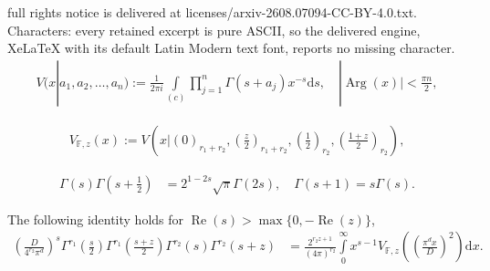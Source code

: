 \documentclass[10pt,a4paper]{amsart}
\newcommand{\Arg}{\operatorname{Arg}}
\renewcommand{\Re}{\operatorname{Re}}
\begin{document}
full rights notice is delivered at licenses/arxiv-2608.07094-CC-BY-4.0.txt. Characters: every retained excerpt is pure ASCII, so the delivered engine, XeLaTeX with its default Latin Modern text font, reports no missing character.
\begin{align}\label{Steen fn}
V(x| a_1, a_2, \ldots, a_n) := \frac{1}{2\pi i}\int\limits_{(c)}\prod_{j=1}^{n}\Gamma(s + a_j)x^{-s}\text{d}s, \quad |\Arg(x)| < \frac{\pi n}{2}, 
\end{align}

\begin{align}\label{Short notation}
V_{\mathbb{F},z}(x) := V\left(x\bigg|\left(0\right)_{r_1 + r_2}, \left(\frac{z}{2}\right)_{r_1 + r_2}, \left(\frac{1}{2}\right)_{r_2}, \left(\frac{1+z}{2}\right)_{r_2}\right),
\end{align}

\begin{align}\label{Legendre's Duplication Formula}
\Gamma(s)\Gamma\left(s + \frac{1}{2}\right)  &= 2^{1-2s}\sqrt{\pi}\Gamma(2s),  \quad \Gamma(s+1) = s\Gamma(s).
\end{align}

\begin{lemma}\label{Lemma for Mellin trans}
The following identity holds for $\Re(s) > \max\{0, -\Re(z)\}$,
\begin{align*}
\left(\frac{D}{4^{r_2}\pi^{d}}\right)^{s}\Gamma^{r_1}\left(\frac{s}{2}\right)\Gamma^{r_1}\left(\frac{s+z}{2}\right)\Gamma^{r_2}(s)\Gamma^{r_2}(s+z)
&= \frac{2^{r_2 z + 1}}{(4\pi)^{r_2}}\int\limits_{0}^\infty x^{s-1}V_{\mathbb{F},z}\left(\left(\frac{\pi^{d} x}{D}\right)^2\right) \mathrm{d}x.
\end{align*}
\end{lemma}
\end{document}
